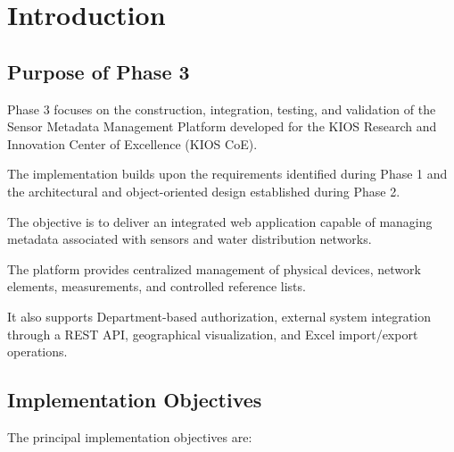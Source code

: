 \documentclass[11pt,a4paper]{article}
\begin{document}
\tableofcontents

\newpage


\section{Introduction}

\subsection{Purpose of Phase 3}

Phase 3 focuses on the construction, integration, testing, and
validation of the Sensor Metadata Management Platform developed
for the KIOS Research and Innovation Center of Excellence
(KIOS CoE).

The implementation builds upon the requirements identified
during Phase 1 and the architectural and object-oriented
design established during Phase 2.

The objective is to deliver an integrated web application
capable of managing metadata associated with sensors and
water distribution networks.

The platform provides centralized management of physical
devices, network elements, measurements, and controlled
reference lists.

It also supports Department-based authorization, external
system integration through a REST API, geographical
visualization, and Excel import/export operations.

\subsection{Implementation Objectives}

The principal implementation objectives are:
\end{document}
